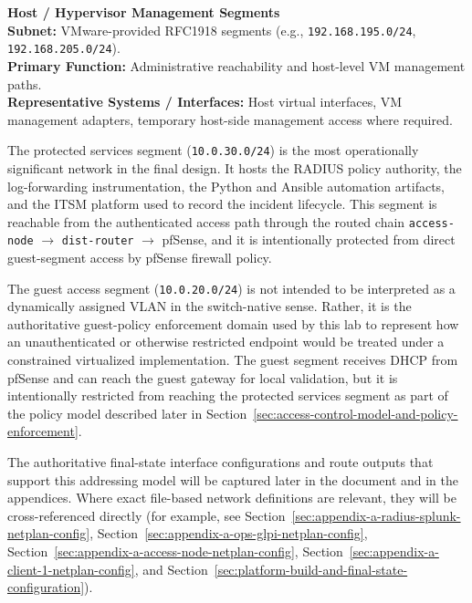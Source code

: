 \documentclass[11pt]{article}
\begin{document}
\medskip

\textbf{Host / Hypervisor Management Segments} \\
\textbf{Subnet:} VMware-provided RFC1918 segments (e.g., \texttt{192.168.195.0/24}, \texttt{192.168.205.0/24}). \\
\textbf{Primary Function:} Administrative reachability and host-level VM management paths. \\
\textbf{Representative Systems / Interfaces:} Host virtual interfaces, VM management adapters, temporary host-side management access where required.

\medskip

The protected services segment (\texttt{10.0.30.0/24}) is the most operationally significant network in the final design. It hosts the RADIUS policy authority, the log-forwarding instrumentation, the Python and Ansible automation artifacts, and the ITSM platform used to record the incident lifecycle. This segment is reachable from the authenticated access path through the routed chain \texttt{access-node} $\rightarrow$ \texttt{dist-router} $\rightarrow$ pfSense, and it is intentionally protected from direct guest-segment access by pfSense firewall policy.

The guest access segment (\texttt{10.0.20.0/24}) is not intended to be interpreted as a dynamically assigned VLAN in the switch-native sense. Rather, it is the authoritative guest-policy enforcement domain used by this lab to represent how an unauthenticated or otherwise restricted endpoint would be treated under a constrained virtualized implementation. The guest segment receives DHCP from pfSense and can reach the guest gateway for local validation, but it is intentionally restricted from reaching the protected services segment as part of the policy model described later in Section~\ref{sec:access-control-model-and-policy-enforcement}.

The authoritative final-state interface configurations and route outputs that support this addressing model will be captured later in the document and in the appendices. Where exact file-based network definitions are relevant, they will be cross-referenced directly (for example, see Section~\ref{sec:appendix-a-radius-splunk-netplan-config}, Section~\ref{sec:appendix-a-ops-glpi-netplan-config}, Section~\ref{sec:appendix-a-access-node-netplan-config}, Section~\ref{sec:appendix-a-client-1-netplan-config}, and Section~\ref{sec:platform-build-and-final-state-configuration}).

\end{document}
